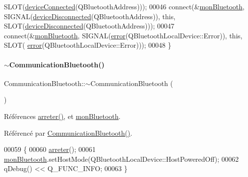 \begin{DoxyCode}
      SLOT(\hyperlink{class_communication_bluetooth_a046af482ca42ce0071aee1b2cf3a1a44}{deviceConnected}(QBluetoothAddress)));
00046     connect(&\hyperlink{class_communication_bluetooth_abc0a9f1ce7a055021027ebc841154c9c}{monBluetooth}, SIGNAL(\hyperlink{class_communication_bluetooth_aaaeaea386c629e980580072f7221b9f0}{deviceDisconnected}(QBluetoothAddress)), \textcolor{keyword}{
      this}, SLOT(\hyperlink{class_communication_bluetooth_aaaeaea386c629e980580072f7221b9f0}{deviceDisconnected}(QBluetoothAddress)));
00047     connect(&\hyperlink{class_communication_bluetooth_abc0a9f1ce7a055021027ebc841154c9c}{monBluetooth}, SIGNAL(\hyperlink{class_communication_bluetooth_a6e0d7054012e11af9d55d6d4f5764259}{error}(QBluetoothLocalDevice::Error)), \textcolor{keyword}{this}, SLOT(
      \hyperlink{class_communication_bluetooth_a6e0d7054012e11af9d55d6d4f5764259}{error}(QBluetoothLocalDevice::Error)));
00048 \}
\end{DoxyCode}
\mbox{\label{class_communication_bluetooth_a13c72d24359f40c204e94f3ef1ab6fd3}} 
\paragraph{\texorpdfstring{$\sim$\+Communication\+Bluetooth()}{~CommunicationBluetooth()}\hspace{0.1cm}{\footnotesize\ttfamily [1/2]}}
{\footnotesize\ttfamily Communication\+Bluetooth\+::$\sim$\+Communication\+Bluetooth (\begin{DoxyParamCaption}{ }\end{DoxyParamCaption})}



Références \hyperlink{class_communication_bluetooth_ac87aa0a33a650b981786979468d34324}{arreter()}, et \hyperlink{class_communication_bluetooth_abc0a9f1ce7a055021027ebc841154c9c}{mon\+Bluetooth}.



Référencé par \hyperlink{class_communication_bluetooth_ae1c3be7b0a32ee1142d958bad3d7c571}{Communication\+Bluetooth()}.


\begin{DoxyCode}
00059 \{
00060     \hyperlink{class_communication_bluetooth_ac87aa0a33a650b981786979468d34324}{arreter}();
00061     \hyperlink{class_communication_bluetooth_abc0a9f1ce7a055021027ebc841154c9c}{monBluetooth}.setHostMode(QBluetoothLocalDevice::HostPoweredOff);
00062     qDebug() << Q\_FUNC\_INFO;
00063 \}
\end{DoxyCode}
\mbox{\label{class_communication_bluetooth_ae1c3be7b0a32ee1142d958bad3d7c571}} 
